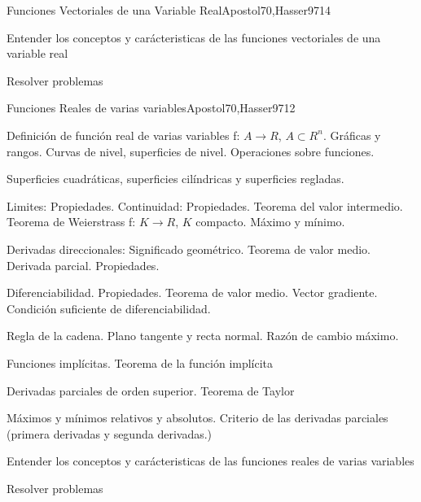 \begin{syllabus}
\begin{unit}{Funciones Vectoriales de una Variable Real}{Apostol70,Hasser97}{14}
   \begin{unitgoals}
         \item  Entender los conceptos y carácteristicas de las funciones vectoriales de una variable real
         \item  Resolver problemas
   \end{unitgoals}
\end{unit}

\begin{unit}{Funciones Reales de varias variables}{Apostol70,Hasser97}{12}
   \begin{topics}
	\item  Definición de función real de varias variables f: $A \rightarrow R$, $A \subset R^n$. Gráficas y rangos. Curvas de nivel, superficies de nivel. Operaciones sobre funciones.
	\item  Superficies cuadráticas, superficies cilíndricas y superficies regladas.
	\item  Limites: Propiedades. Continuidad: Propiedades. Teorema del valor intermedio. Teorema de Weierstrass f: $K \rightarrow R$, $K$ compacto. Máximo y mínimo.
	\item  Derivadas direccionales: Significado geométrico. Teorema de valor medio. Derivada parcial. Propiedades.
	\item  Diferenciabilidad. Propiedades. Teorema de valor medio. Vector gradiente. Condición suficiente de diferenciabilidad.
	\item  Regla de la cadena. Plano tangente y recta normal. Razón de cambio máximo.
	\item Funciones implícitas. Teorema de la función implícita
	\item Derivadas parciales de orden superior. Teorema de Taylor
	\item Máximos y mínimos relativos y absolutos. Criterio de las derivadas parciales (primera derivadas y segunda derivadas.)
   \end{topics}

   \begin{unitgoals}
         \item  Entender los conceptos y carácteristicas de las funciones reales de varias variables
         \item  Resolver problemas
   \end{unitgoals}
\end{unit}


\end{syllabus}
